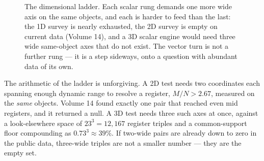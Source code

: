 \documentclass[11pt, letterpaper, openany]{book}
\begin{document}
\begin{figure}[H]
\centering
{}
\caption{The dimensional ladder. Each scalar rung demands one more wide axis on the same objects, and
each is harder to feed than the last: the 1D survey is nearly exhausted, the 2D survey is empty on
current data (Volume 14), and a 3D scalar engine would need three wide same-object axes that do not
exist. The vector turn is not a further rung --- it is a step sideways, onto a question with abundant
data of its own.}
\end{figure}

The arithmetic of the ladder is unforgiving. A 2D test needs two coordinates each spanning enough
dynamic range to resolve a register, $M/N > 2.67$, measured on the \emph{same} objects. Volume 14
found exactly one pair that reached even mid registers, and it returned a null. A 3D test needs three
such axes at once, against a look-elsewhere space of $23^3 = 12{,}167$ register triples and a
common-support floor compounding as $0.73^3 \approx 39\%$. If two-wide pairs are already down to zero
in the public data, three-wide triples are not a smaller number --- they are the empty set.
\end{document}
